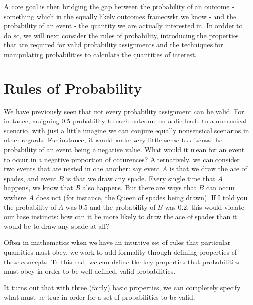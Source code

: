 \documentclass[
  letterpaper,
  DIV=11,
  numbers=noendperiod]{scrreprt}
\begin{document}
A core goal is then bridging the gap between the probability of an
outcome - something which in the equally likely outcomes frameowkr we
know - and the probability of an event - the quantity we are actually
interested in. In ordder to do so, we will next consider the rules of
probability, introducing the properties that are required for valid
probability assignments and the techniques for manipulating
probabilities to calculate the quantities of interest.

\section{Rules of Probability}\label{rules-of-probability}

We have previously seen that not every probability assignment can be
valid. For instance, assigning \(0.5\) probability to each outcome on a
die leads to a nonsenical scenario. with just a little imagine we can
conjure equally nonsensical scenarios in other regards. For instance, it
would make very little sense to discuss the probability of an event
being a negative value. What would it mean for an event to occur in a
negative proportion of occurences? Alternatively, we can consider two
events that are nested in one another: say event \(A\) is that we draw
the ace of spades, and event \(B\) is that we draw any spade. Every
single time that \(A\) happens, we know that \(B\) also happens. But
there are ways that \(B\) can occur wwhere \(A\) does not (for instance,
the Queen of spades being drawn). If I told you the probability of \(A\)
was \(0.5\) and the probability of \(B\) was \(0.2\), this would violate
our base instincts: how can it be more likely to draw the ace of spades
than it would be to draw any spade at all?

Often in mathematics when we have an intuitive set of rules that
particular quantities must obey, we work to add formality through
defining properties of these concepts. To this end, we can define the
key properties that probabilities must obey in order to be well-defined,
valid probabilities.

It turns out that with three (fairly) basic properties, we can
completely specify what must be true in order for a set of probabilities
to be valid.
\end{document}
